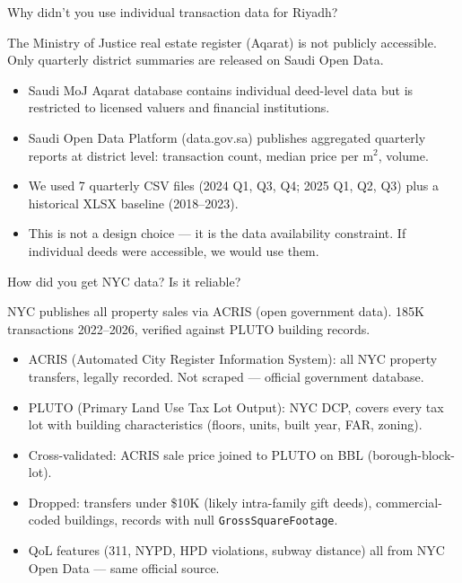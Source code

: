 \documentclass[11pt, a4paper, twoside]{article}
\begin{document}
\begin{question}{Why didn't you use individual transaction data for Riyadh?}
\begin{shortanswer}
The Ministry of Justice real estate register (Aqarat) is not publicly
accessible. Only quarterly district summaries are released on Saudi Open Data.
\end{shortanswer}

\begin{detail}
\begin{itemize}
  \item Saudi MoJ Aqarat database contains individual deed-level data but is
        restricted to licensed valuers and financial institutions.
  \item Saudi Open Data Platform (data.gov.sa) publishes aggregated quarterly
        reports at district level: transaction count, median price per m$^2$,
        volume.
  \item We used 7 quarterly CSV files (2024 Q1, Q3, Q4; 2025 Q1, Q2, Q3) plus
        a historical XLSX baseline (2018--2023).
  \item This is not a design choice --- it is the data availability constraint.
        If individual deeds were accessible, we would use them.
\end{itemize}
\end{detail}
\end{question}

\bigskip

\begin{question}{How did you get NYC data? Is it reliable?}
\begin{shortanswer}
NYC publishes all property sales via ACRIS (open government data). 185K
transactions 2022--2026, verified against PLUTO building records.
\end{shortanswer}

\begin{detail}
\begin{itemize}
  \item ACRIS (Automated City Register Information System): all NYC property
        transfers, legally recorded. Not scraped --- official government
        database.
  \item PLUTO (Primary Land Use Tax Lot Output): NYC DCP, covers every tax lot
        with building characteristics (floors, units, built year, FAR, zoning).
  \item Cross-validated: ACRIS sale price joined to PLUTO on BBL
        (borough-block-lot).
  \item Dropped: transfers under \$10K (likely intra-family gift deeds),
        commercial-coded buildings, records with null \texttt{GrossSquareFootage}.
  \item QoL features (311, NYPD, HPD violations, subway distance) all from NYC
        Open Data --- same official source.
\end{itemize}
\end{detail}
\end{question}
\end{document}
